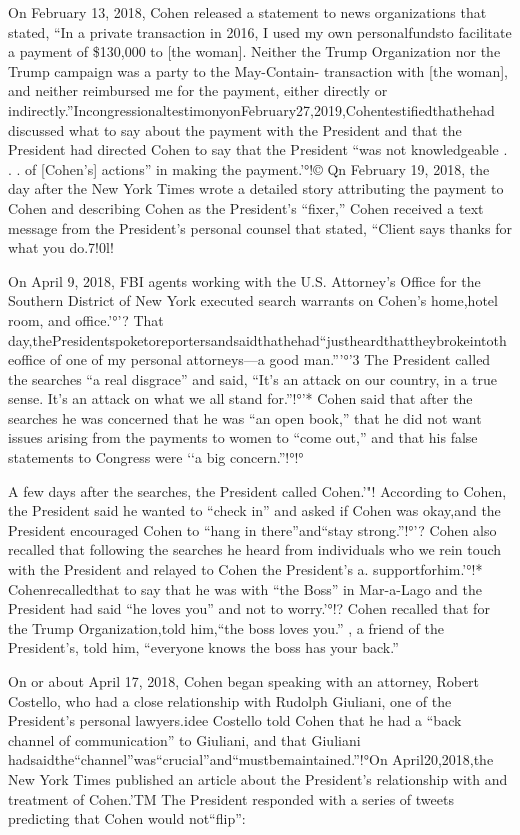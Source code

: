 On February 13, 2018, Cohen released a statement to news organizations that stated, “In a
private transaction in 2016, I used my own personalfundsto facilitate a payment of \$130,000 to
[the woman]. Neither the Trump Organization nor the Trump campaign was a party to the
May-Contain-
transaction with [the woman], and neither reimbursed me for the payment, either directly or
indirectly.”IncongressionaltestimonyonFebruary27,2019,Cohentestifiedthathehad
discussed what to say about the payment with the President and that the President had directed
Cohen to say that the President “was not knowledgeable . . . of [Cohen's] actions” in making the
payment.'°!© Qn February 19, 2018, the day after the New York Times wrote a detailed story
attributing the payment to Cohen and describing Cohen as the President's “fixer,” Cohen received
a text message from the President's personal counsel that stated, “Client says thanks for what you do.7!0l!

On April 9, 2018, FBI agents working with the U.S. Attorney's Office for the Southern District of New York executed search warrants on Cohen's home,hotel room, and office.'°'? That day,thePresidentspoketoreportersandsaidthathehad“justheardthattheybrokeintotheoffice of one of my personal attorneys—a good man.”'°'3 The President called the searches “a real disgrace” and said, “It's an attack on our country, in a true sense. It's an attack on what we all stand for.”!°'* Cohen said that after the searches he was concerned that he was “an open book,” that he did not want issues arising from the payments to women to “come out,” and that his false statements to Congress were ‘‘a big concern.”!°!°

A few days after the searches, the President called Cohen.'"! According to Cohen, the President said he wanted to “check in” and asked if Cohen was okay,and the President encouraged Cohen to “hang in there”and“stay strong.”!°'? Cohen also recalled that following the searches he heard from individuals who we rein touch with the President and relayed to Cohen the President's
a.
supportforhim.'°!* Cohenrecalledthat
to say that he was with “the Boss” in Mar-a-Lago and the President had said “he loves you” and not to worry.'°!? Cohen recalled that for the Trump Organization,told him,“the boss loves you.” , a friend of the President's, told him, “everyone knows the boss has your back.”

On or about April 17, 2018, Cohen began speaking with an attorney, Robert Costello, who had a close relationship with Rudolph Giuliani, one of the President's personal lawyers.idee Costello told Cohen that he had a “back channel of communication” to Giuliani, and that Giuliani hadsaidthe“channel”was“crucial”and“mustbemaintained.”!°On April20,2018,the New York Times published an article about the President's relationship with and treatment of Cohen.'TM The President responded with a series of tweets predicting that Cohen would not“flip”:

